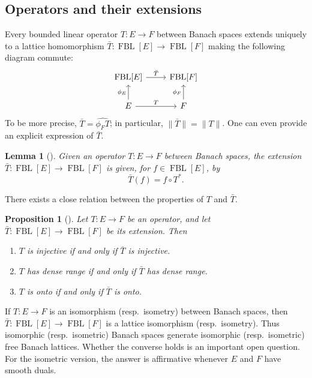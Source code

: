 \documentclass{memo-l}
\newtheorem{lem}[theorem]{Lemma}
\newtheorem{prop}[theorem]{Proposition}
\theoremstyle{definition}
\theoremstyle{remark}
\numberwithin{section}{chapter}
\numberwithin{equation}{chapter}
\newcommand{\FBL}[1]{\operatorname{FBL}[#1]}
\begin{document}
\subsection{Operators and their extensions}

Every bounded linear operator $T\colon E\to F$ between Banach spaces
extends uniquely to a lattice homomorphism $\bar{T}\colon \FBL E\to
\FBL F$ making the following diagram commute:
\[
\begin{tikzcd}
    \FBL E\arrow[r, "\bar{T}"]&\FBL F\\
    E\arrow[u, "\phi _E"]\arrow[r, "T"]&F\arrow[u, "\phi _F"]
\end{tikzcd}
\]
To be more precise, $\bar{T}=\widehat{\phi _F T}$; in particular,
$\|\bar{T}\|=\|T\|$. One can even provide an explicit expression of
$\bar{T}$.

\begin{lem}[{\cite[Lemma 3.1]{oikhberg_etal2022}}]\label{lem:FBL_extension}
    Given an operator $T\colon E\to F$ between Banach spaces, the
    extension $\bar{T}\colon \FBL E\to \FBL F$ is given, for $f \in
    \FBL E$, by
    \[
        \bar{T}(f)=f\circ T^{*}.
    \]
\end{lem}

There exists a close relation between the properties of $T$ and
$\bar{T}$.

\begin{prop}[{\cite[Proposition 3.2]{oikhberg_etal2022}}]\label{prop:FBL_extension_properties}
    Let $T\colon E\to F$ be an operator, and let $\bar{T}\colon \FBL
    E\to \FBL F$ be its extension. Then
    \begin{enumerate}
        \item $T$ is injective if and only if $\bar{T}$ is injective.
        \item $T$ has dense range if and only if $\bar{T}$ has dense
            range.
        \item $T$ is onto if and only if $\bar{T}$ is onto.
    \end{enumerate}
\end{prop}

If $T\colon E\to F$ is an isomorphism (resp.\ isometry) between Banach
spaces, then $\bar{T}\colon \FBL E\to \FBL F$ is a lattice isomorphism
(resp.\ isometry). Thus isomorphic (resp.\ isometric) Banach spaces
generate isomorphic (resp.\ isometric) free Banach lattices. Whether
the converse holds is an important open question. For the
isometric version, the answer is affirmative whenever $E$ and $F$ have
smooth duals.
\end{document}
